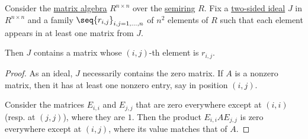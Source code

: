 \begin{proposition}\label{thm:elements_of_matrix_algebra_ideal}
  Consider the \hyperref[thm:matrix_algebra]{matrix algebra} \( R^{n \times n} \) over the \hyperref[def:semiring]{semiring} \( R \). Fix a \hyperref[def:semiring_ideal]{two-sided ideal} \( J \) in \( R^{n \times n} \) and a family \( \seq{ r_{i,j} }_{i, j = 1, \ldots, n} \) of \( n^2 \) elements of \( R \) such that each element appears in at least one matrix from \( J \).

  Then \( J \) contains a matrix whose \( (i, j) \)-th element is \( r_{i, j} \).
\end{proposition}
\begin{proof}
  As an ideal, \( J \) necessarily contains the zero matrix. If \( A \) is a nonzero matrix, then it has at least one nonzero entry, say in position \( (i, j) \).

  Consider the matrices \( E_{i,i} \) and \( E_{j,j} \) that are zero everywhere except at \( (i, i) \) (resp. at \( (j, j) \)), where they are \( 1 \). Then the product \( E_{i,i} A E_{j,j} \) is zero everywhere except at \( (i, j) \), where its value matches that of \( A \).


\end{proof}
